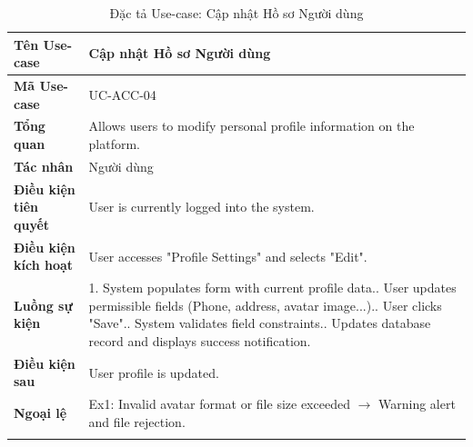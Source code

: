\newpage
\begin{longtable}{|p{3.5cm}|p{11.5cm}|}
    \hline
    \textbf{Tên Use-case} & \textbf{Cập nhật Hồ sơ Người dùng} \\
    \hline
    \textbf{Mã Use-case} & UC-ACC-04 \\
    \hline
    \textbf{Tổng quan} & Allows users to modify personal profile information on the platform. \\
    \hline
    \textbf{Tác nhân} & Người dùng \\
    \hline
    \textbf{Điều kiện tiên quyết} & User is currently logged into the system. \\
    \hline
    \textbf{Điều kiện kích hoạt} & User accesses "Profile Settings" and selects "Edit". \\
    \hline
    \textbf{Luồng sự kiện} & 
    1. System populates form with current profile data.\newline
    2. User updates permissible fields (Phone, address, avatar image...).\newline
    3. User clicks "Save".\newline
    4. System validates field constraints.\newline
    5. Updates database record and displays success notification. \\
    \hline
    \textbf{Điều kiện sau} & User profile is updated. \\
    \hline
    \textbf{Ngoại lệ} & 
    Ex1: Invalid avatar format or file size exceeded $\rightarrow$ Warning alert and file rejection. \\
    \hline
    \caption{Đặc tả Use-case: Cập nhật Hồ sơ Người dùng}
\end{longtable}

